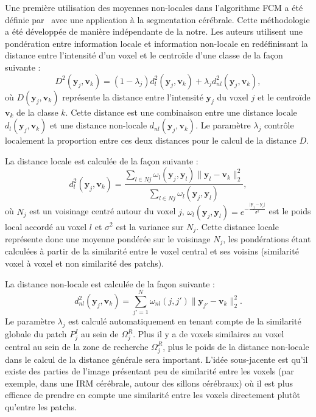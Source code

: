 Une première utilisation des moyennes non-locales dans l'algorithme FCM a été définie par~\cite{Wang:CMIG:2008} avec une application à la segmentation cérébrale.
Cette méthodologie a été développée de manière indépendante de la notre.
Les auteurs utilisent une pondération entre information locale et information non-locale en redéfinissant la distance entre l'intensité d'un voxel et le centroïde d'une classe de la façon suivante :
\begin{equation}
D^{2}(\mathbf{y}_{j}, \mathbf{v}_{k}) = (1-\lambda_{j}) d^{2}_{l}(\mathbf{y}_{j}, \mathbf{v}_{k}) + \lambda_{j} d^{2}_{nl}(\mathbf{y}_{j}, \mathbf{v}_{k}) \label{nlfcm:wang:distance},
\end{equation}
où $D(\mathbf{y}_{j}, \mathbf{v}_{k})$ représente la distance entre l'intensité $\mathbf{y}_{j}$ du voxel $j$ et le centroïde $\mathbf{v}_k$ de la classe $k$.
Cette distance est une combinaison entre une distance locale $d_{l}(\mathbf{y}_{j}, \mathbf{v}_{k})$ et une distance non-locale $d_{nl}(\mathbf{y}_{j}, \mathbf{v}_{k})$.
Le paramètre $\lambda_{j}$ contrôle localement la proportion entre ces deux distances pour le calcul de la distance $D$.

La distance locale est calculée de la façon suivante :
\begin{equation}
d^{2}_{l}(\mathbf{y}_{j}, \mathbf{v}_{k}) = \frac{\sum_{l \in N{j}} \omega_{l} (\mathbf{y}_{j}, \mathbf{y}_{l}) \lVert \mathbf{y}_{l} - \mathbf{v}_{k} \rVert^{2}_{2}}{\sum_{l \in N{j}} \omega_{l} (\mathbf{y}_{j}, \mathbf{y}_{l})} \label{nlfcm:wang:distance:locale},
\end{equation}
où $N_{j}$ est un voisinage centré autour du voxel $j$, $\omega_{l} (\mathbf{y}_{j}, \mathbf{y}_{l}) = e^{-\frac{\lvert \mathbf{y}_{j} - \mathbf{y}_{l} \rvert}{\sigma^{2}}}$ est le poids local accordé au voxel $l$ et $\sigma^{2}$ est la variance sur $N_{j}$.
Cette distance locale représente donc une moyenne pondérée sur le voisinage $N_j$, les pondérations étant calculées à partir de la similarité entre le voxel central et ses voisins (similarité voxel à voxel et non similarité des patchs).

La distance non-locale est calculée de la façon suivante : 
\begin{equation}
d^{2}_{nl}(\mathbf{y}_{j}, \mathbf{v}_{k}) = \sum_{j' = 1}^{N}\omega_{nl}(j,j') \lVert \mathbf{y}_{j'} - \mathbf{v}_{k} \rVert^{2}_{2}.
\end{equation}
Le paramètre $\lambda_{j}$ est calculé automatiquement en tenant compte de la similarité globale du patch $P^{I}_{j}$ au sein de $\Omega^{R}_{j}$. 
Plus il y a de voxels similaires au voxel central au sein de la zone de recherche $\Omega^R_j$, plus le poids de la distance non-locale dans le calcul de la distance générale sera important.
L'idée sous-jacente est qu'il existe des parties de l'image présentant peu de similarité entre les voxels (par exemple, dans une IRM cérébrale, autour des sillons cérébraux) où il est plus efficace de prendre en compte une similarité entre les voxels directement plutôt qu'entre les patchs.

